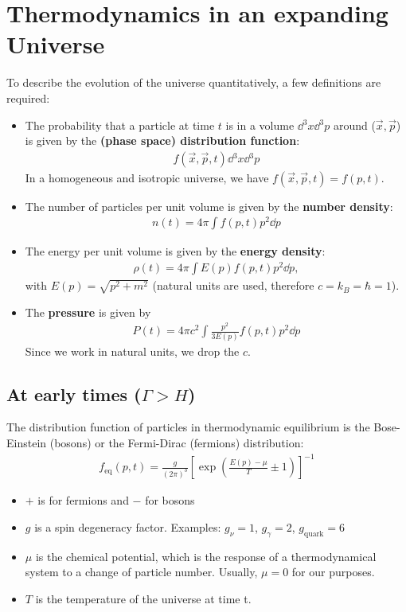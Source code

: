 \section{Thermodynamics in an expanding Universe}

To describe the evolution of the universe quantitatively, a few definitions are required:

\begin{itemize}
	\item The probability that a particle at time $t$ is in a volume $\dd{^3 x} \dd{^3 p}$ around ($ \vec{x}, \vec{p}$) is given by the \textbf{(phase space) distribution function}:
	\begin{align*}
		f(\vec{x}, \vec{p}, t) \dd{^3 x} \dd{^3 p}
	\end{align*}
	In a homogeneous and isotropic universe, we have $f(\vec{x}, \vec{p}, t) = f(p, t)$.
	\item The number of particles per unit volume is given by the \textbf{number density}:
	\begin{align*}
		n(t) = 4\pi \int f(p,t) p^2  \dd{p}
	\end{align*}
	\item The energy per unit volume is given by the \textbf{energy density}:
	\begin{align*}
		\rho(t) = 4 \pi \int E(p) f(p,t) p^2 \dd{p},
	\end{align*}
	with $E(p) = \sqrt{p^2 + m^2}$  (natural units are used, therefore $c= k_B = \hbar = 1$).
	\item The \textbf{pressure} is given by
	\begin{align*}
		P(t) = 4 \pi c^2 \int \frac{p^2}{3 E(p)} f(p,t) p^2 \dd{p}
	\end{align*}
	Since we work in natural units, we drop the $c$.
\end{itemize}


\subsection{At early times ($\Gamma > H$)}
\label{ssec:early-times}
The distribution function of particles in thermodynamic equilibrium is the Bose-Einstein (bosons) or the Fermi-Dirac (fermions) distribution:
\begin{align*}
	f_\text{eq}(p,t)
	= \frac{g}{(2\pi)^3} \left[ \exp\left( 
		\frac{E(p)-\mu}{T} \pm 1
	 \right) \right]^{-1}
\end{align*}
\begin{itemize}
	\item $+$ is for fermions and $-$ for bosons
	\item $g$ is a spin degeneracy factor. Examples: $g_\nu = 1$, $g_\gamma = 2$, $g_\text{quark} = 6$
	\item $\mu$ is the chemical potential, which is the response of a thermodynamical system to a change of particle number. Usually, $\mu=0$ for our purposes.
	\item $T$ is the temperature of the universe at time t.
\end{itemize}

